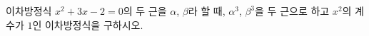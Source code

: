 이차방정식 $x^2+3x-2=0$의 두 근을 $\alpha$, $\beta$라 할 때, $\alpha^3$, $\beta^3$을 두 근으로 하고 $x^2$의 계수가 $1$인 이차방정식을 구하시오.

